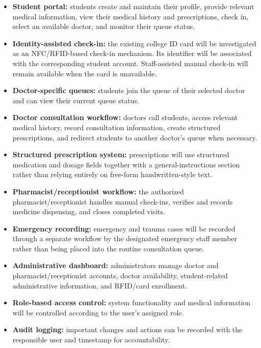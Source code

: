 \documentclass[11pt,a4paper]{article}
\begin{document}
\begin{itemize}

    \item \textbf{Student portal:} students create and maintain their profile, provide relevant medical information, view their medical history and prescriptions, check in, select an available doctor, and monitor their queue status.

    \item \textbf{Identity-assisted check-in:} the existing college ID card will be investigated as an NFC/RFID-based check-in mechanism. Its identifier will be associated with the corresponding student account. Staff-assisted manual check-in will remain available when the card is unavailable.

    \item \textbf{Doctor-specific queues:} students join the queue of their selected doctor and can view their current queue status.

    \item \textbf{Doctor consultation workflow:} doctors call students, access relevant medical history, record consultation information, create structured prescriptions, and redirect students to another doctor's queue when necessary.

    \item \textbf{Structured prescription system:} prescriptions will use structured medication and dosage fields together with a general-instructions section rather than relying entirely on free-form handwritten-style text.

    \item \textbf{Pharmacist/receptionist workflow:} the authorized pharmacist/receptionist handles manual check-ins, verifies and records medicine dispensing, and closes completed visits.

    \item \textbf{Emergency recording:} emergency and trauma cases will be recorded through a separate workflow by the designated emergency staff member rather than being placed into the routine consultation queue.

    \item \textbf{Administrative dashboard:} administrators manage doctor and pharmacist/receptionist accounts, doctor availability, student-related administrative information, and RFID/card enrollment.

    \item \textbf{Role-based access control:} system functionality and medical information will be controlled according to the user's assigned role.

    \item \textbf{Audit logging:} important changes and actions can be recorded with the responsible user and timestamp for accountability.

\end{itemize}
\end{document}

